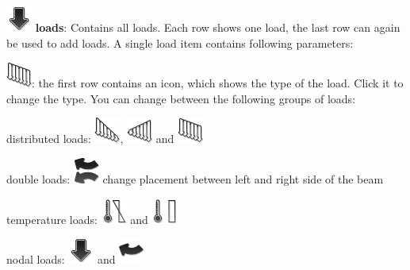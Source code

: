 \documentclass[a4paper,11pt]{report}
\begin{document}
\begin{trivlist}
	\item[] \includegraphics[scale = 0.5]{../../icons/load.png} \textbf{loads}: Contains all loads. Each row shows one load, the last row can again be used to add loads. A single load item contains following parameters:
		\begin{trivlist}
		\leftskip=1cm
		\item[] \includegraphics[scale = 0.5]{../../icons/ustload.png}: the first row contains an icon, which shows the type of the load. Click it to change the type. You can change between the following groups of loads:
		\begin{trivlist}
		\leftskip=2cm
		\item[] distributed loads: \includegraphics[scale = 0.5]{../../icons/dstload.png}, \includegraphics[scale = 0.5]{../../icons/istload.png} and \includegraphics[scale = 0.5]{../../icons/ustload.png}
		\item[] double loads: \includegraphics[scale = 0.5]{../../icons/doubleL.png} change placement between left and right side of the beam
		\item[] temperature loads: \includegraphics[scale = 0.5]{../../icons/tempDiff.png} and \includegraphics[scale = 0.5]{../../icons/tempChange.png}
		\item[] nodal loads: \includegraphics[scale = 0.5]{../../icons/load.png} and \includegraphics[scale = 0.5]{../../icons/moment.png}

\end{trivlist}
\end{trivlist}
\end{trivlist}
\end{document}
